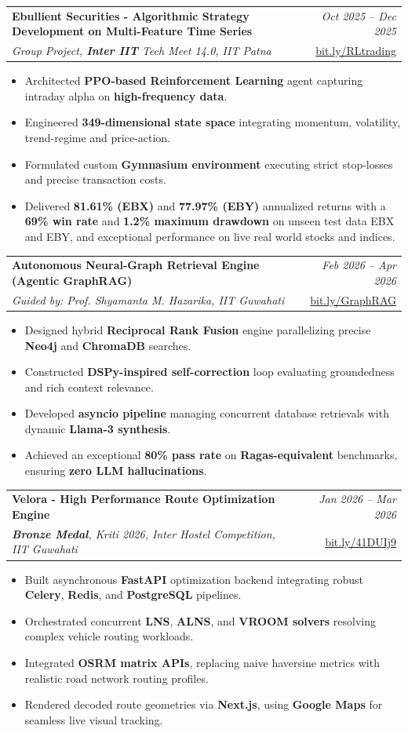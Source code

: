 \documentclass[a4paper,11pt]{article}
\makeatletter
\newcommand{\resumeProject}[4]{
\vspace{0.5mm}\item
    \begin{tabular*}{0.98\textwidth}[t]{l@{\extracolsep{\fill}}r}
        \textbf{#1} & \textit{\footnotesize{#3}} \\
        \footnotesize{\textit{#2}} & \footnotesize{#4}
    \end{tabular*}
    \vspace{-2.4mm}
}
\newcommand{\resumeItemListStart}{\begin{justify}\begin{itemize}[leftmargin=3ex, rightmargin=2ex, noitemsep,labelsep=1.2mm]\small}
\newcommand{\resumeItemListEnd}{\end{itemize}\end{justify}\vspace{-3mm}}
\makeatother
\begin{document}
    \resumeProject
      {Ebullient Securities - Algorithmic Strategy Development on Multi-Feature Time Series} 
      {Group Project, \textbf{Inter IIT} Tech Meet 14.0, IIT Patna} 
      {Oct 2025 -- Dec 2025} 
      {\href{https://github.com/dhruvgohil24/Dhruv-Inter-final}{bit.ly/RLtrading}} 
      \resumeItemListStart
        \item {Architected \textbf{PPO-based Reinforcement Learning} agent capturing intraday alpha on \textbf{high-frequency data}.}
        \item {Engineered \textbf{349-dimensional state space} integrating momentum, volatility, trend-regime and price-action.}
        \item {Formulated custom \textbf{Gymnasium environment} executing strict stop-losses and precise transaction costs.}
        \item {Delivered \textbf{81.61\% (EBX)} and \textbf{77.97\% (EBY)} annualized returns with a \textbf{69\% win rate} and \textbf{1.2\% maximum drawdown} on unseen test data EBX and EBY, and exceptional performance on live real world stocks and indices.}
      \resumeItemListEnd

    \resumeProject
      {Autonomous Neural-Graph Retrieval Engine (Agentic GraphRAG)} 
      {Guided by: Prof. Shyamanta M. Hazarika, IIT Guwahati} 
      {Feb 2026 -- Apr 2026} 
       {\href{https://github.com/dhruvgohil24/AgenticGraphRag}{bit.ly/GraphRAG}} 
      \resumeItemListStart
        \item {Designed hybrid \textbf{Reciprocal Rank Fusion} engine parallelizing precise \textbf{Neo4j} and \textbf{ChromaDB} searches.}
        \item {Constructed \textbf{DSPy-inspired self-correction} loop evaluating groundedness and rich context relevance.}
        \item {Developed \textbf{asyncio pipeline} managing concurrent database retrievals with dynamic \textbf{Llama-3 synthesis}.}
        \item {Achieved an exceptional \textbf{80\% pass rate} on \textbf{Ragas-equivalent} benchmarks, ensuring \textbf{zero LLM hallucinations}.}
      \resumeItemListEnd

    \resumeProject
      {Velora - High Performance Route Optimization Engine} 
      {\textbf{Bronze Medal}, Kriti 2026, Inter Hostel Competition, IIT Guwahati} 
      {Jan 2026 -- Mar 2026} 
    {\href{https://github.com/dhruvgohil24/RouteOptimizationKriti}{bit.ly/41DUIj9}} 
      \resumeItemListStart
        \item {Built asynchronous \textbf{FastAPI} optimization backend integrating robust \textbf{Celery}, \textbf{Redis}, and \textbf{PostgreSQL} pipelines.}
        \item {Orchestrated concurrent \textbf{LNS}, \textbf{ALNS}, and \textbf{VROOM solvers} resolving complex vehicle routing workloads.}
        \item {Integrated \textbf{OSRM matrix APIs}, replacing naive haversine metrics with realistic road network routing profiles.}
        \item {Rendered decoded route geometries via \textbf{Next.js}, using \textbf{Google Maps} for seamless live visual tracking.}
      \resumeItemListEnd
\end{document}
